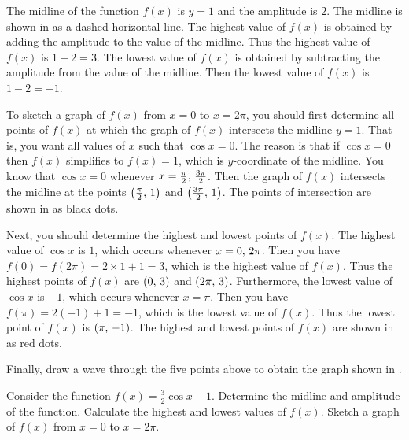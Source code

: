 \documentclass[a4paper,oneside,12pt]{article}
\begin{document}
\begin{solution}
The midline of the function $f(x)$ is $y = 1$ and the amplitude is
$2$.  The midline is shown in  as a
dashed horizontal line.  The highest value of $f(x)$ is obtained by
adding the amplitude to the value of the midline.  Thus the highest
value of $f(x)$ is $1 + 2 = 3$.  The lowest value of $f(x)$ is
obtained by subtracting the amplitude from the value of the midline.
Then the lowest value of $f(x)$ is $1 - 2 = -1$.

To sketch a graph of $f(x)$ from $x = 0$ to $x = 2\pi$, you should
first determine all points of $f(x)$ at which the graph of $f(x)$
intersects the midline $y = 1$.  That is, you want all values of $x$
such that $\cos x = 0$.  The reason is that if $\cos x = 0$ then
$f(x)$ simplifies to $f(x) = 1$, which is $y$-coordinate of the
midline.  You know that $\cos x = 0$ whenever
$x = {\frac{\pi}{2}},\, {\frac{3\pi}{2}}$.  Then the graph of $f(x)$
intersects the midline at the points $\left\lparen{\frac{\pi}{2}},\, {1}\right\rparen$ and
$\left\lparen{\frac{3\pi}{2}},\, {1}\right\rparen$.  The points of intersection are shown in
 as black dots.

Next, you should determine the highest and lowest points of $f(x)$.
The highest value of $\cos x$ is $1$, which occurs whenever
$x = {0},\, {2\pi}$.  Then you have
$f(0) = f(2\pi) = 2 \times 1 + 1 = 3$, which is the highest value of
$f(x)$.  Thus the highest points of $f(x)$ are $\left\lparen{0},\, {3}\right\rparen$ and
$\left\lparen{2\pi},\, {3}\right\rparen$.  Furthermore, the lowest value of $\cos x$ is $-1$,
which occurs whenever $x = \pi$.  Then you have
$f(\pi) = 2 (-1) + 1 = -1$, which is the lowest value of $f(x)$.  Thus
the lowest point of $f(x)$ is $\left\lparen{\pi},\, {-1}\right\rparen$.  The highest and
lowest points of $f(x)$ are shown in
 as red dots.

Finally, draw a wave through the five points above to obtain the graph
shown in .
\end{solution}

\begin{exercise}
Consider the function $f(x) = \frac{3}{2} \cos x - 1$.  Determine the
midline and amplitude of the function.  Calculate the highest and
lowest values of $f(x)$.  Sketch a graph of $f(x)$ from $x = 0$ to
$x = 2\pi$.
\end{exercise}
\end{document}
